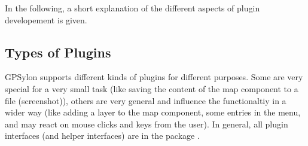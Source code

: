 \documentclass[a4paper]{article} %
\begin{document}
In the following, a short explanation of the different aspects of
plugin developement is given.

\subsection{Types of Plugins}
\label{SoftwareDesignOfTheGpstoolPackage-TypesOfPlugins}

GPSylon supports different kinds of plugins for different
purposes. Some are very special for a very small task (like saving the
content of the map component to a file (screenshot)), others are very
general and influence the functionaltiy in a wider way (like adding a
layer to the map component, some entries in the menu, and may react on
mouse clicks and keys from the user). In general, all plugin
interfaces (and helper interfaces) are in the package
.
\end{document}
